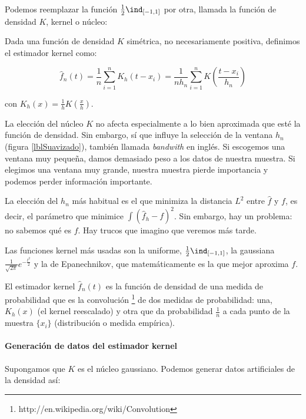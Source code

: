 \documentclass{apuntes}
\begin{document}
Podemos reemplazar la función $\frac{1}{2}\ind_{[-1, 1]}$ por otra, llamada la función de densidad $K$, kernel o núcleo:

\begin{defn}
Dada una función de densidad $K$ simétrica, no necesariamente positiva, definimos el estimador kernel como:

\[ \hat{f}_n(t) = \frac{1}{n}\sum_{i=1}^n K_h (t - x_i)  = \frac{1}{nh_n} \sum_{i=1}^n K\left(\frac{t-x_i}{h_n}\right) \]

con $K_h(x) = \frac{1}{h}K(\frac{x}{h})$.
\end{defn}

La elección del núcleo $K$ no afecta especialmente a lo bien aproximada que esté la función de densidad. Sin embargo, sí que influye la selección de la ventana $h_n$ (figura \ref{lblSuavizado}), también llamada \textit{bandwith} en inglés.  Si escogemos una ventana muy pequeña, damos demasiado peso a los datos de nuestra muestra. Si elegimos una ventana muy grande, nuestra muestra pierde importancia y podemos perder información importante.

La elección del $h_n$ más habitual es el que minimiza la distancia $L^2$ entre $\hat{f}$ y $f$, es decir, el parámetro que minimice $\displaystyle\int\left(\hat{f}_h-f\right)^2$. Sin embargo, hay un problema: no sabemos qué es $f$. Hay trucos que imagino que veremos más tarde.


Las funciones kernel más usadas son la uniforme, $\frac{1}{2}\ind_{[-1, 1]}$, la gaussiana $\frac{1}{\sqrt{2 \pi}}e^{-\frac{t^2}{2}}$ y la de Epanechnikov, que matemáticamente es la que mejor aproxima $f$.

El estimador kernel $\hat{f}_n(t)$ es la función de densidad de una medida de probabilidad que es la convolución \footnote{http://en.wikipedia.org/wiki/Convolution} de dos medidas de probabilidad: una, $K_h(x)$ (el kernel reescalado) y otra que da probabilidad $\frac{1}{n}$ a cada punto de la muestra $\{x_i\}$ (distribución o medida empírica).

\paragraph{Generación de datos del estimador kernel} Supongamos que $K$ es el núcleo gaussiano. Podemos generar datos artificiales de la densidad así:
\end{document}
